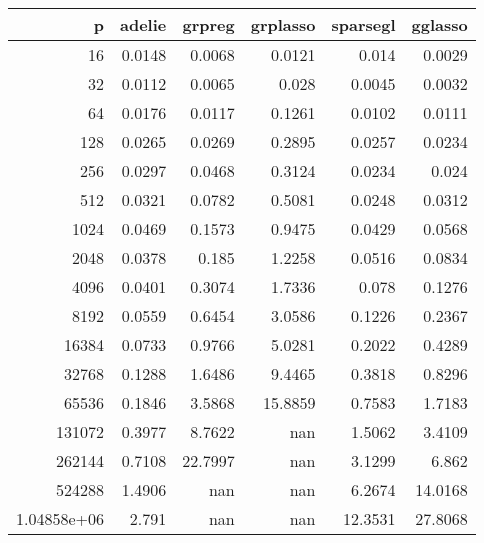\begin{tabular}{rrrrrr}
\hline
                p &   adelie &   grpreg &   grplasso &   sparsegl &   gglasso \\
\hline
     16           &      0.0148 &   0.0068 &     0.0121 &     0.014  &    0.0029 \\
     32           &      0.0112 &   0.0065 &     0.028  &     0.0045 &    0.0032 \\
     64           &      0.0176 &   0.0117 &     0.1261 &     0.0102 &    0.0111 \\
    128           &      0.0265 &   0.0269 &     0.2895 &     0.0257 &    0.0234 \\
    256           &      0.0297 &   0.0468 &     0.3124 &     0.0234 &    0.024  \\
    512           &      0.0321 &   0.0782 &     0.5081 &     0.0248 &    0.0312 \\
   1024           &      0.0469 &   0.1573 &     0.9475 &     0.0429 &    0.0568 \\
   2048           &      0.0378 &   0.185  &     1.2258 &     0.0516 &    0.0834 \\
   4096           &      0.0401 &   0.3074 &     1.7336 &     0.078  &    0.1276 \\
   8192           &      0.0559 &   0.6454 &     3.0586 &     0.1226 &    0.2367 \\
  16384           &      0.0733 &   0.9766 &     5.0281 &     0.2022 &    0.4289 \\
  32768           &      0.1288 &   1.6486 &     9.4465 &     0.3818 &    0.8296 \\
  65536           &      0.1846 &   3.5868 &    15.8859 &     0.7583 &    1.7183 \\
 131072           &      0.3977 &   8.7622 &   nan      &     1.5062 &    3.4109 \\
 262144           &      0.7108 &  22.7997 &   nan      &     3.1299 &    6.862  \\
 524288           &      1.4906 & nan      &   nan      &     6.2674 &   14.0168 \\
      1.04858e+06 &      2.791  & nan      &   nan      &    12.3531 &   27.8068 \\
\hline
\end{tabular}